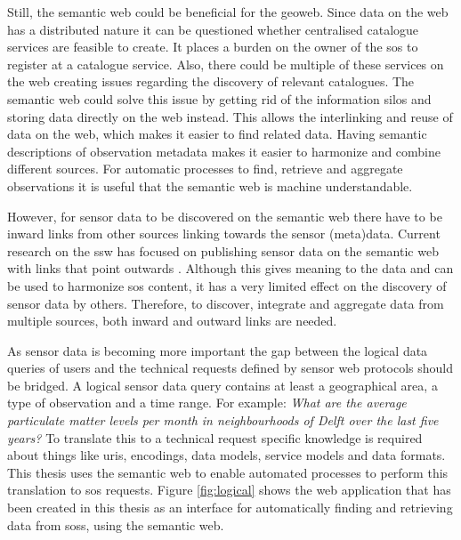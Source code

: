 Still, the semantic web could be beneficial for the geoweb. Since data on the web has a distributed nature it can be questioned whether centralised catalogue services are feasible to create. It places a burden on the owner of the \ac{sos} to register at a catalogue service. Also, there could be multiple of these services on the web creating issues regarding the discovery of relevant catalogues. The semantic web could solve this issue by getting rid of the information silos and storing data directly on the web instead. This allows the interlinking and reuse of data on the web, which makes it easier to find related data. Having semantic descriptions of observation metadata makes it easier to harmonize and combine different sources. For automatic processes to find, retrieve and aggregate observations it is useful that the semantic web is machine understandable. 

However, for sensor data to be discovered on the semantic web there have to be inward links from other sources linking towards the sensor (meta)data. Current research on the \ac{ssw} has focused on publishing sensor data on the semantic web with links that point outwards \citep{SSW:Atkinson, SSW:Janowicz, SSW:Pschorr}. Although this gives meaning to the data and can be used to harmonize \ac{sos} content, it has a very limited effect on the discovery of sensor data by others. Therefore, to discover, integrate and aggregate data from multiple sources, both inward and outward links are needed.  

As sensor data is becoming more important the gap between the logical data queries of users and the technical requests defined by sensor web protocols should be bridged. A logical sensor data query contains at least a geographical area, a type of observation and a time range. For example: \textit{What are the average particulate matter levels per month in neighbourhoods of Delft over the last five years?} To translate this to a technical request specific knowledge is required about things like \acp{uri}, encodings, data models, service models and data formats. This thesis uses the semantic web to enable automated processes to perform this translation to \ac{sos} requests. Figure \ref{fig:logical} shows the web application that has been created in this thesis as an interface for automatically finding and retrieving data from \aclp{sos}, using the semantic web. 



